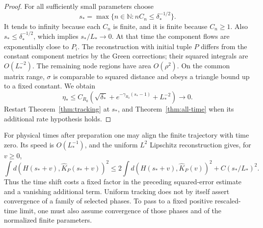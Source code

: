 \begin{proof}
For all sufficiently small parameters choose
\[
 s_*=\max\{n\in\mathbb N:nC_n\le\delta_*^{-1/2}\}.
\]
It tends to infinity because each $C_n$ is
finite, and it is finite because $C_n\ge1$.
Also $s_*\le\delta_*^{-1/2}$, which implies
$s_*/L_*\to0$. At that time the component
flows are exponentially close to $P_i$.
The reconstruction with initial tuple $P$
differs from the constant component metrics
by the Green corrections; their squared
integrals are $O(L_*^{-2})$. The remaining
node regions have area $O(\rho^2)$.
On the common matrix range, $\sigma$ is
comparable to squared distance and obeys
a triangle bound up to a fixed constant.
We obtain
\[
 \eta_*\le C_{R_0}\left(
 \sqrt{\delta_*}+e^{-\gamma_{R_0}(s_*-1)}
 +L_*^{-2}\right)\to0 .
\]
Restart Theorem~\ref{thm:tracking} at
$s_*$, and Theorem~\ref{thm:all-time} when
its additional rate hypothesis holds.
\end{proof}

For physical times after preparation one may align
the finite trajectory with time zero. Its speed
is $O(L_*^{-1})$, and the uniform $L^2$ Lipschitz
reconstruction gives, for $v\ge0$,
\[
 \int d(H(s_*+v),\widehat K_P(s_*+v))^2
 \le 2\int d(H(s_*+v),\widehat K_P(v))^2
       +C(s_*/L_*)^2 .
\]
Thus the time shift costs a fixed factor in the
preceding squared-error estimate and a vanishing
additional term. Uniform tracking does not
by itself assert convergence of a family of
selected phases. To pass to a fixed positive
rescaled-time limit, one must also assume
convergence of those phases and of the
normalized finite parameters.
